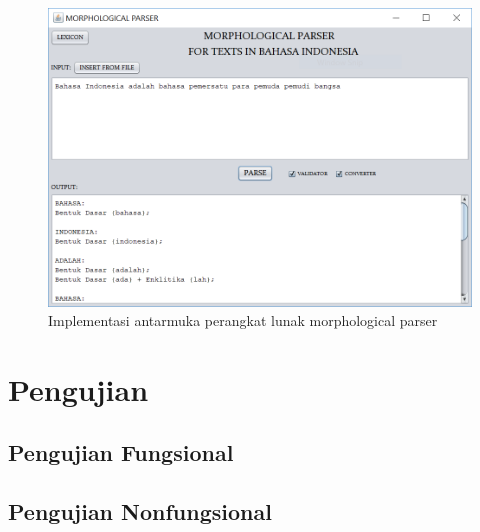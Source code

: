 \begin{figure}[H]
\centering
\includegraphics[scale=0.7]{Gambar/gambar-implementasi-antarmuka}
\caption{Implementasi antarmuka perangkat lunak morphological parser} 
\label{gambar-implementasi-antarmuka}
\end{figure}

\section{Pengujian}
\label{sec:pengujian}

\subsection{Pengujian Fungsional}
\label{sec:pengujianFungsional}

\subsection{Pengujian Nonfungsional}
\label{sec:pengujianNonfungsional}
